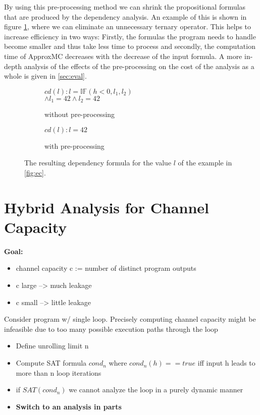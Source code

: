 By using this pre-processing method we can shrink the propositional formulas that are produced by the dependency analysis. An example of this is shown in figure \ref{fig:ppRes}, where we can eliminate an unnecessary ternary operator. This helps to increase efficiency in two ways: Firstly, the formulas the program needs to handle become smaller and thus take less time to process and secondly, the computation time of ApproxMC decreases with the decrease of the input formula. A more in-depth analysis of the effects of the pre-processing on the cost of the analysis as a whole is given in \ref{sec:eval}. 

\begin{figure}
    \begin{subfigure}[t]{.4\textwidth}
        \centering
        $cd(l) : l = \mathbb{IF}(h < 0, l_1, l_2)$ \\ $\land l_1 = 42 \land l_2 = 42$
        \caption{without pre-processing}
    \end{subfigure}
    \hfill
    \begin{subfigure}[t]{.4\textwidth}
        \centering
        $cd(l) : l = 42$
        \vspace{\baselineskip}
        \caption{with pre-processing}
    \end{subfigure}
    \caption{The resulting dependency formula for the value $l$ of the example in \ref{fig:ec}. }
    \label{fig:ppRes}
\end{figure}

\section{Hybrid Analysis for Channel Capacity}
\textbf{Goal:}
\begin{itemize}
    \item channel capacity c := number of distinct program outputs
    \item c large --> much leakage
    \item c small --> little leakage
\end{itemize}
Consider program w/ single loop. Precisely computing channel capacity might be infeasible due to too many possible execution paths through the loop

\begin{itemize}
    \item Define unrolling limit n
    \item Compute SAT formula $cond_n$ where $cond_n(h) == true$ iff input h leads to more than n loop iterations
    \item if $SAT(cond_n)$ we cannot analyze the loop in a purely dynamic manner
    \item \textbf{Switch to an analysis in parts}
\end{itemize}

